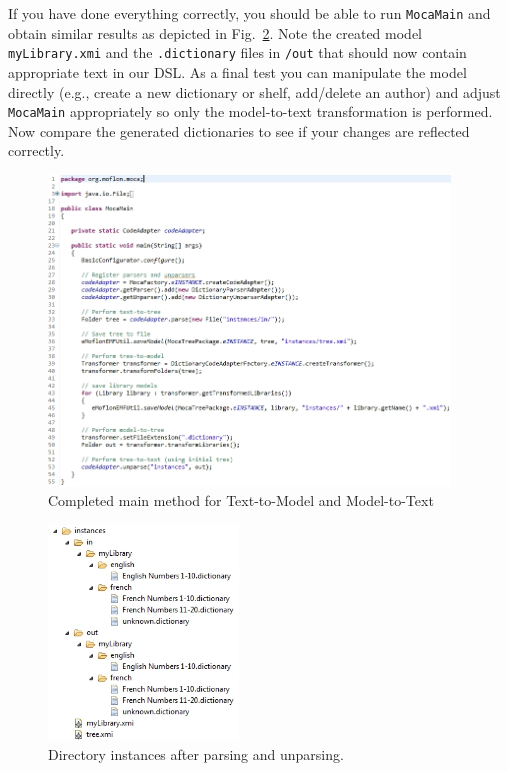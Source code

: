 \begin{enumerate}
If you have done everything correctly, you should be able to run \texttt{MocaMain} and obtain similar results as depicted in Fig.~\ref{fig:moca-FinalResults}.
Note the created model \texttt{myLibrary.xmi} and the \texttt{.dictionary} files in \texttt{/out} that should now contain appropriate text in our DSL.
As a final test you can manipulate the model directly (e.g., create a new dictionary or shelf, add/delete an author) and adjust \texttt{MocaMain} appropriately so only the model-to-text transformation is performed.
Now compare the generated dictionaries to see if your changes are reflected correctly. 
 
\begin{figure}[!htbp]
\begin{center}
 \includegraphics[width=0.95\textwidth]{pics/moca/5MocaTreeToText/MocaMainComplete}
  \caption{Completed main method for Text-to-Model and Model-to-Text} 
  \label{fig:moca-FinalMocaMain}
\end{center}
\end{figure}

\begin{figure}[!htbp]
\begin{center}
 \includegraphics[width=0.45\textwidth]{pics/moca/5MocaTreeToText/InstancesAfterRoundTrip}
  \caption{Directory instances after parsing and unparsing.} 
  \label{fig:moca-FinalResults}
\end{center}
\end{figure}

\end{enumerate}
